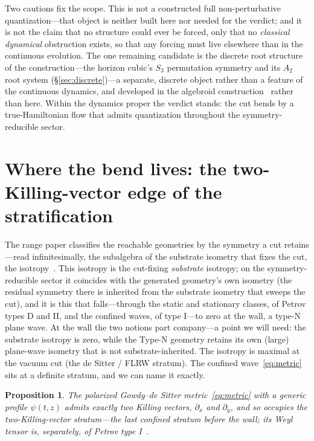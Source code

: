\documentclass[11pt,a4paper]{article}
\theoremstyle{plain}
\newtheorem{proposition}{Proposition}
\theoremstyle{definition}
\theoremstyle{remark}
\begin{document}
Two cautions fix the scope. This is not a constructed full non-perturbative quantization---that object is neither built here nor needed for the verdict; and it is not the claim that no structure could ever be forced, only that no \emph{classical dynamical} obstruction exists, so that any forcing must live elsewhere than in the continuous evolution. The one remaining candidate is the discrete root structure of the construction---the horizon cubic's $S_3$ permutation symmetry and its $A_2$ root system (\S\ref{sec:discrete})---a separate, discrete object rather than a feature of the continuous dynamics, and developed in the algebroid construction~\cite{JanzenAlgebroid} rather than here. Within the dynamics proper the verdict stands: the cut bends by a true-Hamiltonian flow that admits quantization throughout the symmetry-reducible sector.

\section{Where the bend lives: the two-Killing-vector edge of the stratification}\label{sec:strata}

The range paper classifies the reachable geometries by the symmetry a cut retains---read infinitesimally, the subalgebra of the substrate isometry that fixes the cut, the isotropy~\cite{JanzenRange}. This isotropy is the cut-fixing \emph{substrate} isotropy; on the symmetry-reducible sector it coincides with the generated geometry's own isometry (the residual symmetry there is inherited from the substrate isometry that sweeps the cut), and it is this that falls---through the static and stationary classes, of Petrov types D and II, and the confined waves, of type I---to zero at the wall, a type-N plane wave. At the wall the two notions part company---a point we will need: the substrate isotropy is zero, while the Type-N geometry retains its own (large) plane-wave isometry that is not substrate-inherited. The isotropy is maximal at the vacuum cut (the de Sitter / FLRW stratum). The confined wave~\eqref{eq:metric} sits at a definite stratum, and we can name it exactly.

\begin{proposition}\label{prop:twoKV}
The polarized Gowdy--de Sitter metric~\eqref{eq:metric} with a generic profile $\psi(t,z)$ admits exactly two Killing vectors, $\partial_x$ and $\partial_y$, and so occupies the two-Killing-vector stratum---the last confined stratum before the wall; its Weyl tensor is, separately, of Petrov type I~\cite{JanzenRange}.
\end{proposition}
\end{document}
